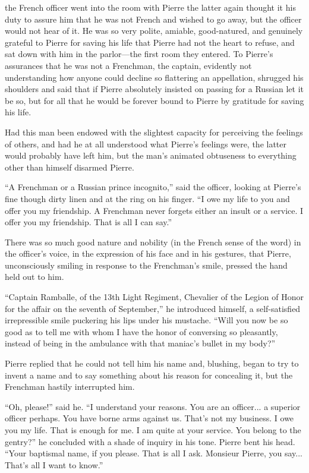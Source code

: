  the French officer went into the room with Pierre the latter
again thought it his duty to assure him that he was not French
and wished to go away, but the officer would not hear of it. He
was so very polite, amiable, good-natured, and genuinely grateful
to Pierre for saving his life that Pierre had not the heart to
refuse, and sat down with him in the parlor---the first room they
entered. To Pierre's assurances that he was not a Frenchman, the
captain, evidently not understanding how anyone could decline so
flattering an appellation, shrugged his shoulders and said that
if Pierre absolutely insisted on passing for a Russian let it be
so, but for all that he would be forever bound to Pierre by
gratitude for saving his life.

Had this man been endowed with the slightest capacity for
perceiving the feelings of others, and had he at all understood
what Pierre's feelings were, the latter would probably have left
him, but the man's animated obtuseness to everything other than
himself disarmed Pierre.

``A Frenchman or a Russian prince incognito,'' said the officer,
looking at Pierre's fine though dirty linen and at the ring on
his finger. ``I owe my life to you and offer you my friendship. A
Frenchman never forgets either an insult or a service. I offer
you my friendship. That is all I can say.''

There was so much good nature and nobility (in the French sense
of the word) in the officer's voice, in the expression of his
face and in his gestures, that Pierre, unconsciously smiling in
response to the Frenchman's smile, pressed the hand held out to
him.

``Captain Ramballe, of the 13th Light Regiment, Chevalier of the
Legion of Honor for the affair on the seventh of September,'' he
introduced himself, a self-satisfied irrepressible smile
puckering his lips under his mustache. ``Will you now be so good
as to tell me with whom I have the honor of conversing so
pleasantly, instead of being in the ambulance with that maniac's
bullet in my body?''

Pierre replied that he could not tell him his name and, blushing,
began to try to invent a name and to say something about his
reason for concealing it, but the Frenchman hastily interrupted
him.

``Oh, please!'' said he. ``I understand your reasons. You are an
officer...  a superior officer perhaps. You have borne arms
against us. That's not my business. I owe you my life. That is
enough for me. I am quite at your service. You belong to the
gentry?'' he concluded with a shade of inquiry in his
tone. Pierre bent his head. ``Your baptismal name, if you
please. That is all I ask. Monsieur Pierre, you say... That's all
I want to know.''

